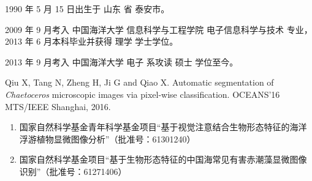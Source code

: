 \begin{resume}


  1990 年 5 月 15 日出生于 山东 省 泰安市。
  
  2009 年 9 月考入 中国海洋大学 信息科学与工程学院 电子信息科学与技术 专业，2013 年 6 月本科毕业并获得 理学 学士学位。
  
  2013 年 9 月考入 中国海洋大学 电子 系攻读 硕士 学位至今。

     
  \begin{enumerate}[{[}1{]}]
  \item Qiu X, Tang N, Zheng H, Ji G and Qiao X. Automatic segmentation of \emph{Chaetoceros} microscopic images via pixel-wise classification. OCEANS'16 MTS/IEEE Shanghai, 2016.
  \end{enumerate}

 
 \begin{enumerate}
  \item 国家自然科学基金青年科学基金项目“基于视觉注意结合生物形态特征的海洋浮游植物显微图像分析”（批准号：61301240）
  \item 国家自然科学基金项目“基于生物形态特征的中国海常见有害赤潮藻显微图像识别”（批准号：61271406）
  \end{enumerate}
 
\end{resume}

